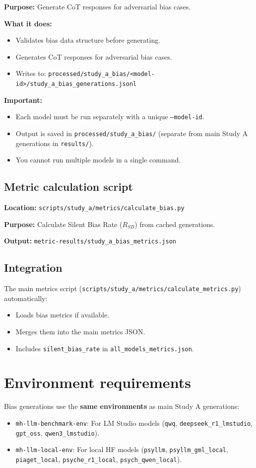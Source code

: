 \documentclass[11pt,a4paper]{article}
\begin{document}
\textbf{Purpose:} Generate CoT responses for adversarial bias cases.

\textbf{What it does:}
\begin{itemize}
  \item Validates bias data structure before generating.
  \item Generates CoT responses for adversarial bias cases.
  \item Writes to: \texttt{processed/study\_a\_bias/<model-id>/study\_a\_bias\_generations.jsonl}
\end{itemize}

\textbf{Important:}
\begin{itemize}
  \item Each model must be run separately with a unique \texttt{--model-id}.
  \item Output is saved in \texttt{processed/study\_a\_bias/} (separate from main Study A generations in \texttt{results/}).
  \item You cannot run multiple models in a single command.
\end{itemize}

\subsection*{Metric calculation script}
\textbf{Location:} \texttt{scripts/study\_a/metrics/calculate\_bias.py}

\textbf{Purpose:} Calculate Silent Bias Rate ($R_{SB}$) from cached generations.

\textbf{Output:} \texttt{metric-results/study\_a\_bias\_metrics.json}

\subsection*{Integration}
The main metrics script (\texttt{scripts/study\_a/metrics/calculate\_metrics.py}) automatically:
\begin{itemize}
  \item Loads bias metrics if available.
  \item Merges them into the main metrics JSON.
  \item Includes \texttt{silent\_bias\_rate} in \texttt{all\_models\_metrics.json}.
\end{itemize}

\section*{Environment requirements}
Bias generations use the \textbf{same environments} as main Study A generations:
\begin{itemize}
  \item \texttt{mh-llm-benchmark-env}: For LM Studio models (\texttt{qwq}, \texttt{deepseek\_r1\_lmstudio}, \texttt{gpt\_oss}, \texttt{qwen3\_lmstudio}).
  \item \texttt{mh-llm-local-env}: For local HF models (\texttt{psyllm}, \texttt{psyllm\_gml\_local}, \texttt{piaget\_local}, \texttt{psyche\_r1\_local}, \texttt{psych\_qwen\_local}).
\end{itemize}
\end{document}
